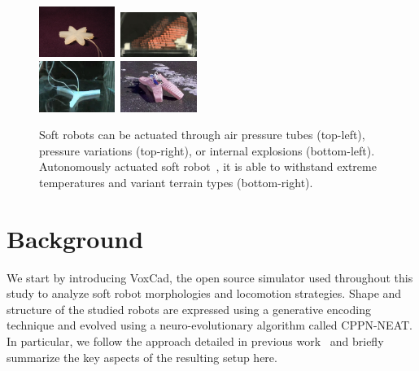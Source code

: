 \documentclass{sig-alternate}
\begin{document}
\begin{figure}[t!]
\centering
\includegraphics[width=0.22\textwidth,height=0.12\textheight]{../Figures/Misc/soft_robotics_figure.png}\		
\includegraphics[width=0.22\textwidth,height=0.12\textheight]{../Figures/Misc/hillerPressureChamber.png}\\[0.1cm]	
\includegraphics[width=0.22\textwidth,height=0.12\textheight]{../Figures/Misc/ExplodingRobot.jpg}\	
\includegraphics[width=0.22\textwidth,height=0.12\textheight]{../Figures/Misc/softbot.jpg}\\
\caption{Soft robots can be actuated through air pressure tubes (top-left), pressure variations (top-right), or internal explosions (bottom-left). Autonomously actuated soft robot~\cite{tolley2014resilient}, it is able to withstand extreme temperatures and variant terrain types (bottom-right).}
\label{fig:softRobotsActuation}
\end{figure}


\section{Background}
We start by introducing VoxCad, the open source simulator used throughout this study to analyze soft robot morphologies and locomotion strategies. Shape and structure of the studied robots are expressed using a generative encoding technique and evolved using a neuro-evolutionary algorithm called CPPN-NEAT. In particular, we follow the approach detailed in previous work~\cite{cheney2013unshackling} and briefly summarize the key aspects of the resulting setup here.
\end{document}

